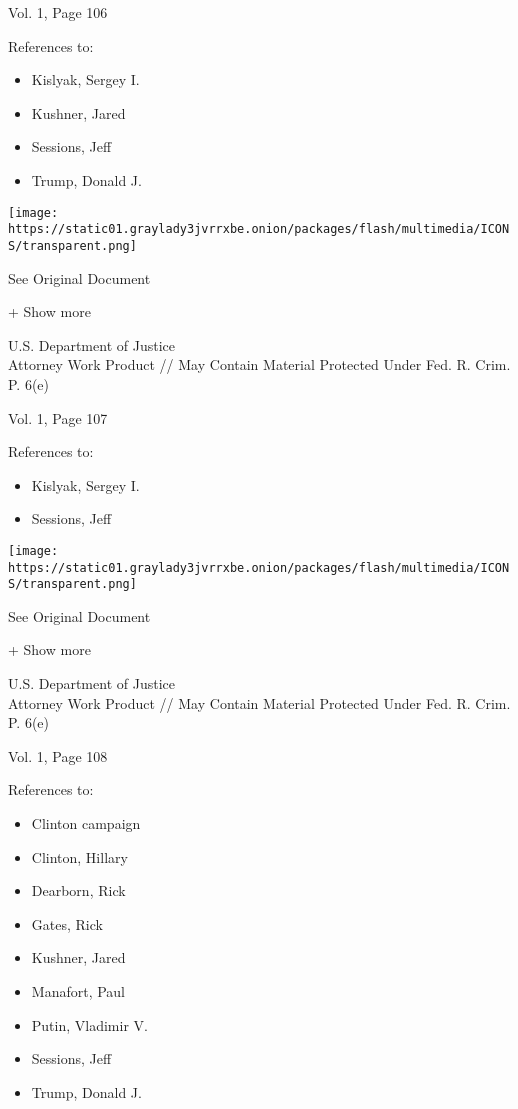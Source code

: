Vol. 1, Page 106

References to:

\begin{itemize}
\tightlist
\item
  Kislyak, Sergey I.
\item
  Kushner, Jared
\item
  Sessions, Jeff
\item
  Trump, Donald J.
\end{itemize}

\protect\hyperlink{}{}

\texttt{[image: https://static01.graylady3jvrrxbe.onion/packages/flash/multimedia/ICONS/transparent.png]}

See Original Document

+ Show more

U.S. Department of Justice\\
Attorney Work Product // May Contain Material Protected Under Fed. R.
Crim. P. 6(e)

Vol. 1, Page 107

References to:

\begin{itemize}
\tightlist
\item
  Kislyak, Sergey I.
\item
  Sessions, Jeff
\end{itemize}

\protect\hyperlink{}{}

\texttt{[image: https://static01.graylady3jvrrxbe.onion/packages/flash/multimedia/ICONS/transparent.png]}

See Original Document

+ Show more

U.S. Department of Justice\\
Attorney Work Product // May Contain Material Protected Under Fed. R.
Crim. P. 6(e)

Vol. 1, Page 108

References to:

\begin{itemize}
\tightlist
\item
  Clinton campaign
\item
  Clinton, Hillary
\item
  Dearborn, Rick
\item
  Gates, Rick
\item
  Kushner, Jared
\item
  Manafort, Paul 
\item
  Putin, Vladimir V.
\item
  Sessions, Jeff
\item
  Trump, Donald J.
\end{itemize}

